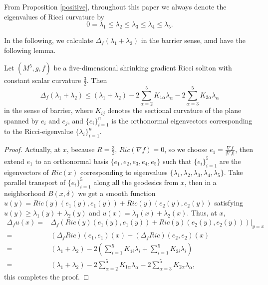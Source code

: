 \documentclass[12pt]{amsart}
\begin{document}
	From Proposition \ref{positive}, throughout this paper we always denote the eigenvalues of Ricci curvature by
	\[
	0=\lambda_1\leq \lambda_2\leq  \lambda_3 \leq  \lambda_4\leq \lambda_5.
	\]
	
	\smallskip
	In the following, we calculate $\Delta_f(\lambda_1+\lambda_2)$ in the barrier sense, amd have the following lemma.
	\begin{lem} Let $(M^5, g, f)$ be a five-dimensional shrinking gradient Ricci soliton with constant scalar curvature $\frac{3}{2}$.  	
		Then
		\begin{equation}\label{l12}
		\Delta_f(\lambda_1+\lambda_2)\leq(\lambda_1+\lambda_2)-2\sum_{\alpha=2}^5 K_{1\alpha}\lambda_\alpha-2\sum_{\alpha=3}^5 K_{2\alpha}\lambda_\alpha
		\end{equation}	
		in the sense of barrier, where $K_{ij}$ denotes the sectional curvature of the plane spanned by $e_i$ and $e_j$, and $\{e_i\}_{i=1}^n$ is the orthonormal eigenvectors corresponding to the Ricci-eigenvalue $ \{\lambda_i\}_{i=1}^n$.
	\end{lem}
	
	\begin{proof}
		Actually, at $x$, because $R=\frac{3}{2}$, $Ric(\nabla f)=0$, so we choose $e_1=\frac{\nabla f}{|\nabla f|}$, then extend $e_1$ to an orthonormal basis $\{e_1, e_2, e_3, e_4,e_5\}$ such that $\{e_i\}_{i=1}^5$ are the eigenvectors of $Ric(x)$ corresponding to eigenvalues $\{\lambda_1, \lambda_2, \lambda_3, \lambda_4, \lambda_5\}$. Take parallel transport of $\{e_i\}_{i=1}^5$ along all the geodesics from $x$, then in a neighborhood $B(x, \delta)$ we get a smooth function $u(y)=Ric(y)(e_1(y), e_1(y))+Ric(y)(e_2(y), e_2(y))$ satisfying $u(y)\geq \lambda_1(y)+\lambda_2(y)$ and  $u(x)= \lambda_1(x)+\lambda_2(x)$.
		Thus, at $x$,
	 \begin{equation*}
		\begin{aligned}
		   \Delta_f u(x)=&\Delta_f\left(Ric(y)(e_1(y), e_1(y))+Ric(y)(e_2(y), e_2(y)) \right)|_{y=x}\\
			=&(\Delta_f Ric)(e_1, e_1)(x)+(\Delta_f Ric)(e_2, e_2)(x)\\
			=&(\lambda_1+\lambda_2)-2(\sum_{i=1}^5 K_{1i}\lambda_i +\sum_{i=1}^5 K_{2i}\lambda_i)\\
			=&(\lambda_1+\lambda_2)-2\sum_{\alpha=2}^5 K_{1\alpha}\lambda_\alpha
			-2\sum_{\alpha=3}^5 K_{2\alpha}\lambda_\alpha,
		\end{aligned}
	\end{equation*}
	this completes the proof.
\end{proof}
	
\end{document}
